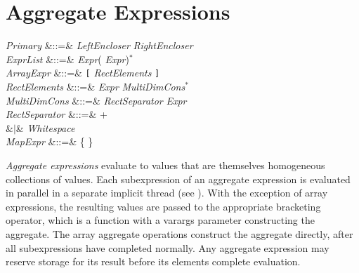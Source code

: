 %
%
%
%

\section{Aggregate Expressions}


\begin{Grammar}
\emph{Primary}
&::=& \emph{LeftEncloser}   \emph{RightEncloser} \\

\emph{ExprList} &::=& \emph{Expr}(\EXP{,} \emph{Expr})$^*$ \\

\emph{ArrayExpr} &::=& \texttt{[}  \emph{RectElements} \texttt{]}\\

\emph{RectElements} &::=& \emph{Expr} \emph{MultiDimCons}$^*$\\

\emph{MultiDimCons} &::=& \emph{RectSeparator} \emph{Expr}\\

\emph{RectSeparator} &::=& \EXP{;}+\\
&$|$& \emph{Whitespace}\\

\emph{MapExpr} &::=& \{   \}\\
\end{Grammar}

\emph{Aggregate expressions} evaluate to values that are themselves
homogeneous collections of values.  Each subexpression of an aggregate
expression is evaluated in parallel in a separate implicit thread (see
).
With the exception of array expressions, the resulting
values are passed to the appropriate bracketing operator, which is a
function with a varargs parameter constructing the aggregate.
The array aggregate operations
construct the aggregate directly, after all
subexpressions have completed normally.  Any aggregate expression may
reserve storage for its result before its elements complete
evaluation.

